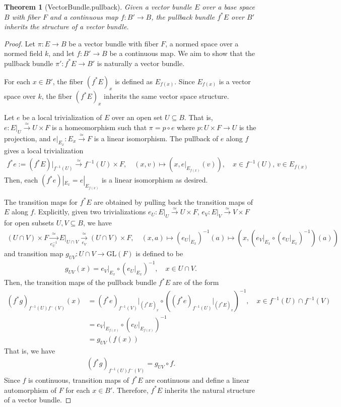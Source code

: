 \documentclass{article}
\newtheorem{theorem}{Theorem}
\begin{document}
\begin{theorem}[VectorBundle.pullback]
Given a vector bundle $E$ over a base space $B$ with fiber $F$ and a continuous map $f:B' \to B$, the pullback bundle $f^*E$ over $B'$ inherits the structure of a vector bundle.
\end{theorem}
\begin{proof}
Let $\pi:E \to B$ be a vector bundle with fiber $F$, a normed space over a normed field $k$, and let $f: B' \to B$ be a continuous map. We aim to show that the pullback bundle $ \pi':f^*E \to B'$ is naturally a vector bundle.

For each $x \in B'$, the fiber $(f^*E)_x$ is defined as $E_{f(x)}$. Since $E_{f(x)}$ is a vector space over $k$, the fiber $(f^*E)_x$ inherits the same vector space structure.

Let $e$ be a local trivialization of $E$ over an open set $U \subseteq B$. That is, $e: E|_U \xrightarrow{\simeq} U \times F$ is a homeomorphism such that $\pi = p \circ e$ where $p: U \times F \to U$ is the projection, and $e|_{E_x}: E_x \xrightarrow{\simeq} F$ is a linear isomorphism. The pullback of $ e $ along $ f $ gives a local trivialization 
\begin{align*}
	f^*e:= (f^*E)|_{f^{-1}(U)} \xrightarrow{\simeq} f^{-1}(U) \times F, \quad (x,v) \mapsto (x,e|_{E_{f(x)}}(v)), \quad x \in f^{-1}(U), \, v \in E_{f(x)}
\end{align*}
Then, each $(f^*e)|_{E_x} = e|_{E_{f(x)}}$ is a linear isomorphism as desired.

The transition maps for $f^*E$ are obtained by pulling back the transition maps of $ E $ along $ f $. Explicitly, given two trivializations $e_U:E|_U \xrightarrow{\simeq} U \times F$, $e_V:E|_V \xrightarrow{\simeq} V \times F$ for open subsets $U,V \subseteq B$, we have 
\begin{align*}
	(U \cap V) \times F \xrightarrow[e_U^{-1}]{\simeq} E|_{U \cap V} \xrightarrow[e_V]{\simeq} (U \cap V) \times F, \quad (x,a) \mapsto (e_U|_{E_x})^{-1}(a) \mapsto (x,(e_V|_{E_x} \circ (e_U|_{E_x})^{-1})(a))
\end{align*}
and transition map $g_{UV}: U \cap V \to \text{GL}(F)$ is defined to be
\begin{align*}
	g_{UV}(x) = e_V|_{E_x} \circ (e_U|_{E_x})^{-1}, \quad x \in U \cap V.
\end{align*}
Then, the transition maps of the pullback bundle $f^*E$ are of the form
\begin{align*}
	(f^*g)_{f^{-1}(U) f^{-}(V)}(x) &= (f^*e)_{f^{-1}(V)}|_{(f^*E)_x} \circ ((f^*e)_{f^{-1}(U)}|_{(f^*E)_x})^{-1}, \quad x \in f^{-1}(U) \cap f^{-1}(V) \\
    &= e_V|_{E_{f(x)}} \circ (e_U|_{E_{f(x)}})^{-1} \\
    &= g_{UV}(f(x))
\end{align*}
That is, we have
\begin{align*}
    (f^*g)_{f^{-1}(U) f^{-}(V)} = g_{UV} \circ f.
\end{align*}
Since $f$ is continuous, transition maps of $f^*E$ are continuous and define a linear automorphism of $F$ for each $x \in B'$. Therefore, $f^*E$ inherits the natural structure of a vector bundle.
\end{proof}
\end{document}
